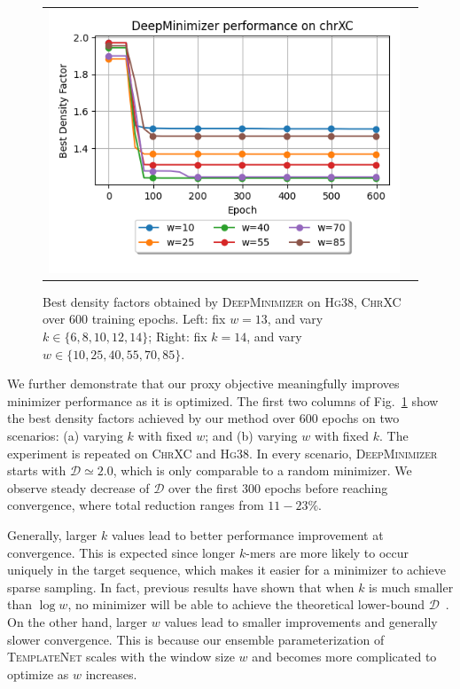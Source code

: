 \begin{figure}[h]
\begin{tabular}{cc}
\includegraphics[width=0.46\columnwidth]{minimizer_plots/mznet_chrXC_k13.png}
\end{tabular}
\caption{Best density factors obtained by \textsc{DeepMinimizer} on \textsc{Hg38}, \textsc{ChrXC} over $600$ training epochs. Left: fix $w=13$, and vary $k \in \{6,8,10,12,14\}$; Right: fix $k=14$, and vary $w \in \{10, 25, 40, 55, 70, 85\}$.}
\label{app-msd-fig:1a}
\end{figure}

\noindent We further demonstrate that our proxy objective meaningfully improves minimizer performance as it is optimized. The first two columns of Fig.~\ref{app-msd-fig:1a} show the best density factors achieved by our method over $600$ epochs on two scenarios: (a) varying $k$ with fixed $w$; and (b) varying $w$ with fixed $k$. The experiment is repeated on \textsc{ChrXC} and \textsc{Hg38}. In every scenario, \textsc{DeepMinimizer} starts with $\mathcal{D}\simeq 2.0$, which is only comparable to a random minimizer. We observe steady decrease of $\mathcal{D}$ over the first $300$ epochs before reaching convergence, where total reduction ranges from $11-23\%$. 


Generally, larger $k$ values lead to better performance improvement at convergence. This is expected since longer $k$-mers are more likely to occur uniquely in the target sequence, which makes it easier for a minimizer to achieve sparse sampling. In fact, previous results have shown that when $k$ is much smaller than $\log w$, no minimizer will be able to achieve the theoretical lower-bound $\mathcal{D}$~\citep{zheng20miniception}. On the other hand, larger $w$ values lead to smaller improvements and generally slower convergence. This is because our ensemble parameterization of \textsc{TemplateNet} scales with the window size $w$ and becomes more complicated to optimize as $w$ increases. 

